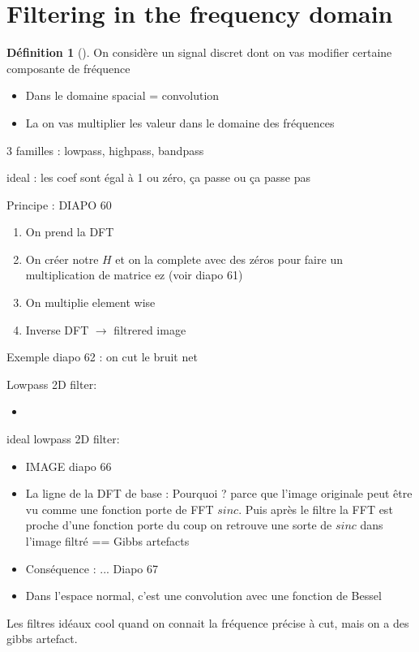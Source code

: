 \documentclass{article}
\theoremstyle{plain}%
\theoremstyle{definition}
\newtheorem{defn}{Définition}[section]
\theoremstyle{remark}
\begin{document}
\section{Filtering in the frequency domain}
\begin{defn}[] 
    On considère un signal discret dont on vas modifier certaine composante de fréquence
    \begin{itemize}
        \item Dans le domaine spacial = convolution
        \item La on vas multiplier les valeur dans le domaine des fréquences
    \end{itemize}
    \item 3 familles : lowpass, highpass, bandpass
    \item ideal : les coef sont égal à 1 ou zéro, ça passe ou ça passe pas
\end{defn}
Principe : DIAPO 60 
\begin{enumerate}
    \item On prend la DFT
    \item On créer notre $ H $ et on la complete avec des zéros pour faire un multiplication de matrice ez (voir diapo 61)
    \item On multiplie element wise
    \item Inverse DFT $\rightarrow$ filtrered image
\end{enumerate}
Exemple diapo 62 : on cut le bruit net

Lowpass 2D filter:
\begin{itemize}
    \item 
\end{itemize}

ideal lowpass 2D filter:
\begin{itemize}
    \item IMAGE diapo 66
    \item La ligne de la DFT de base : Pourquoi ? parce que l'image originale peut être vu comme une fonction porte de FFT $ sinc $. Puis après le filtre la FFT est proche d'une fonction porte du coup on retrouve une sorte de $ sinc $ dans l'image filtré == Gibbs artefacts 
    \item Conséquence : ... Diapo 67
    \item Dans l'espace normal, c'est une convolution avec une fonction de Bessel
\end{itemize}
Les filtres idéaux cool quand on connait la fréquence précise à cut, mais on a des gibbs artefact.
\end{document}
